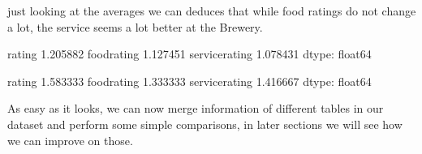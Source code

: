 \documentclass[letterpaper,10pt,english]{jupyterBook}
\begin{document}
\sphinxAtStartPar
just looking at the averages we can deduces that while food ratings do not change a lot, the service seems a lot better at the Brewery.

\begin{sphinxVerbatim}[commandchars=\\\{\}]
\PYG{p}{[}\PYG{p}{]}\PYG{p}{[}\PYG{p}{[}  \PYG{p}{]}\PYG{p}{]}
\end{sphinxVerbatim}

\begin{sphinxVerbatim}[commandchars=\\\{\}]
rating            1.205882
food\PYGZus{}rating       1.127451
service\PYGZus{}rating    1.078431
dtype: float64
\end{sphinxVerbatim}

\begin{sphinxVerbatim}[commandchars=\\\{\}]
\PYG{p}{[}\PYG{p}{]}\PYG{p}{[}\PYG{p}{[}  \PYG{p}{]}\PYG{p}{]}
\end{sphinxVerbatim}

\begin{sphinxVerbatim}[commandchars=\\\{\}]
rating            1.583333
food\PYGZus{}rating       1.333333
service\PYGZus{}rating    1.416667
dtype: float64
\end{sphinxVerbatim}

\sphinxAtStartPar
As easy as it looks, we can now merge information of different tables in our dataset and perform some simple comparisons, in later sections we will see how we can improve on those.
\end{document}
